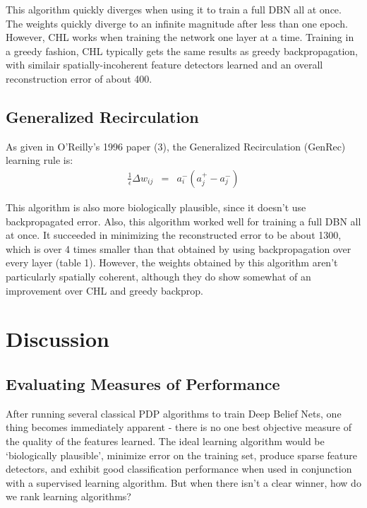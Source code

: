 \documentclass{article} %
\begin{document}
This algorithm quickly diverges when using it to train a full DBN all at once. The weights quickly diverge to an infinite magnitude after less than one epoch. However, CHL works when training the network one layer at a time. Training in a greedy fashion, CHL typically gets the same results as greedy backpropagation, with similair spatially-incoherent feature detectors learned and an overall reconstruction error of about 400.

\subsection{Generalized Recirculation}

As given in O'Reilly's 1996 paper (3), the Generalized Recirculation (GenRec) learning rule is:
\begin{eqnarray*}
\frac{1}{\epsilon}\Delta w_{ij} &=& a_i^-(a_j^+ - a_j^-)  
\end{eqnarray*}

This algorithm is also more biologically plausible, since it doesn't use backpropagated error. Also, this algorithm worked well for training a full DBN all at once. It succeeded in minimizing the reconstructed error to be about 1300, which is over 4 times smaller than that obtained by using backpropagation over every layer (table 1). However, the weights obtained by this algorithm aren't particularly spatially coherent, although they do show somewhat of an improvement over CHL and greedy backprop.

\section{Discussion}


\subsection{Evaluating Measures of Performance}

After running several classical PDP algorithms to train Deep Belief Nets, one thing becomes immediately apparent - there is no one best objective measure of the quality of the features learned. The ideal learning algorithm would be `biologically plausible', minimize error on the training set, produce sparse feature detectors, and exhibit good classification performance when used in conjunction with a supervised learning algorithm. But when there isn't a clear winner, how do we rank learning algorithms?
\end{document}
